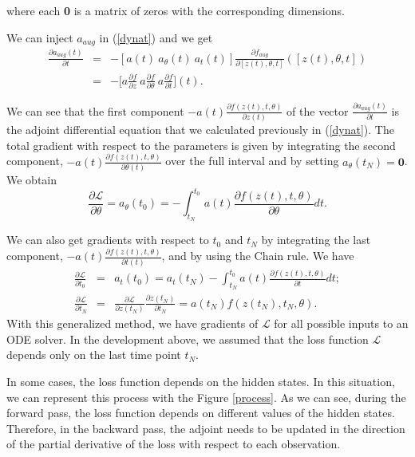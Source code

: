 \documentclass[10pt,a4paper]{article}
\theoremstyle{definition}
\theoremstyle{plain}
\begin{document}
where each \textbf{0} is a matrix of zeros with the corresponding dimensions.

We can inject $a_{aug}$ in (\ref{dynat}) and we get
\begin{eqnarray*}
\frac{\partial a_{aug}(t)}{\partial t} 
&=& - [a(t) \ a_\theta (t) \ a_t (t)]\frac{\partial f_{aug}}{\partial [ z(t),\theta , t]}([z(t),\theta , t]) \\
&=& -\Big[a\frac{\partial f}{\partial z} \ a\frac{\partial f}{\partial \theta} \ a\frac{\partial  f}{\partial t}\Big] (t).
\end{eqnarray*}


We can see that the first component $-a(t)\frac{\partial f(z(t),t,\theta)}{\partial z(t)}$ of the vector $\frac{\partial a_{aug}(t)}{\partial t} $ is the adjoint differential equation that we calculated previously in (\ref{dynat}). The total gradient with respect to the parameters is given by integrating the second component, $-a(t)\frac{\partial f(z(t),t,\theta)}{\partial \theta(t)}$ over the full interval and by setting $a_\theta (t_N) = \textbf{0}$. We obtain 
\begin{equation*}
\frac{\partial \mathcal{L}}{\partial \theta} = a_\theta (t_0) = - \int_{t_N}^{t_0} a(t) \frac{\partial f(z(t),t,\theta)}{\partial \theta} dt.
\end{equation*}


We can also get gradients with respect to $t_0$ and $t_N$ by integrating the last component, $-a(t)\frac{\partial f(z(t),t,\theta)}{\partial t(t)}$, and by using the Chain rule. We have
\begin{eqnarray*}
\frac{\partial \mathcal{L}}{\partial t_0} &=& a_t(t_0) = a_t(t_N) - \int_{t_N}^{t_0} a(t) \frac{\partial f(z(t),t,\theta)}{\partial t} dt ; \\
\frac{\partial \mathcal{L}}{\partial t_N} &=& \frac{\partial \mathcal{L}}{\partial z(t_N)} \frac{\partial z(t_N)}{\partial t_N} = a(t_N)f(z(t_N),t_N,\theta).
\end{eqnarray*}
With this generalized method, we have gradients of $\mathcal{L}$ for all possible inputs to an ODE solver. In the development above, we assumed that the loss function $\mathcal{L}$ depends only on the last time point $t_N$.


In some cases, the loss function depends on the hidden states. In this situation, we can represent this process  with the Figure \ref{process}. As we can see, during the forward pass, the loss function depends on different values of the hidden states. Therefore, in the backward pass, the adjoint needs to be updated in the direction of the partial derivative of the loss with respect to each observation.
\end{document}
